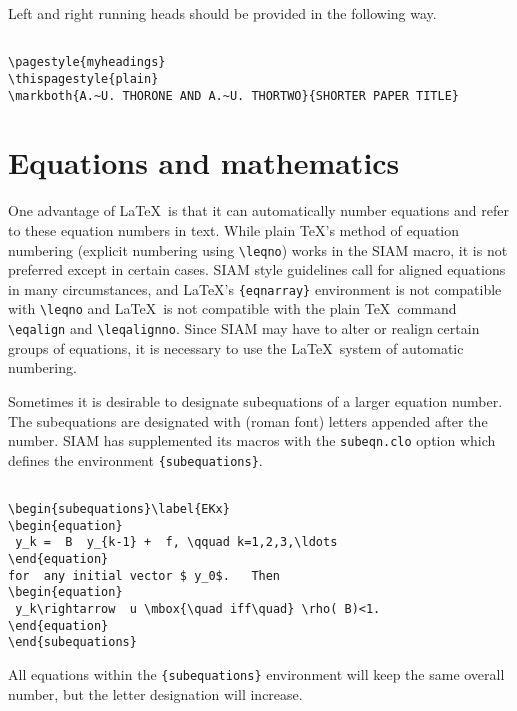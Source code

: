 \documentclass[final,leqno,onefignum,onetabnum]{siamltex1213}
\begin{document}
Left and right running heads should be provided in the
following way.

\begin{verbatim}

\pagestyle{myheadings}
\thispagestyle{plain}
\markboth{A.~U. THORONE AND A.~U. THORTWO}{SHORTER PAPER TITLE} 

\end{verbatim}

\section{Equations and mathematics}

One advantage of \LaTeX\ is that it can automatically number
equations and refer to these equation numbers in text. While plain \TeX's
method of equation numbering (explicit numbering using
\verb|\leqno|) works in the SIAM macro, it is not preferred
except in certain cases. SIAM style guidelines call for
aligned equations in many circumstances, and \LaTeX's 
\verb|{eqnarray}| environment is not compatible with
\verb|\leqno| and \LaTeX\ is not compatible with the plain
\TeX\ command \verb|\eqalign| and \verb|\leqalignno|. Since
SIAM may have to alter or realign certain groups of
equations, it is necessary to use the \LaTeX\ system of
automatic numbering.

Sometimes it is desirable to designate subequations of a larger
equation number. The subequations are designated with
(roman font) letters appended after the number. SIAM has
supplemented its macros with the {\tt subeqn.clo} option which
defines the environment \verb|{subequations}|.

\begin{verbatim}

\begin{subequations}\label{EKx}
\begin{equation}
 y_k =  B  y_{k-1} +  f, \qquad k=1,2,3,\ldots  
\end{equation}
for  any initial vector $ y_0$.   Then 
\begin{equation}
 y_k\rightarrow  u \mbox{\quad iff\quad} \rho( B)<1.
\end{equation}
\end{subequations}

\end{verbatim}

All equations within the \verb|{subequations}| environment
will keep the same overall number, but the letter
designation will increase.
\end{document}
